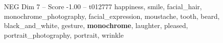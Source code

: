\begin{textsample}{NEG Dim 7 – Score -1.00 – t012777}  \label{ex:f7_neg_027}
happiness, smile, facial\_hair, monochrome\_photography, facial\_expression, moustache, tooth, beard, black\_and\_white, gesture, \textbf{monochrome}, laughter, pleased, portrait\_photography, portrait, wrinkle

\end{textsample}

